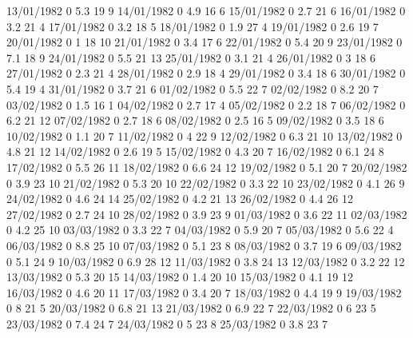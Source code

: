 13/01/1982  0      5.3    19     9 
14/01/1982  0      4.9    16     6 
15/01/1982  0      2.7    21     6 
16/01/1982  0      3.2    21     4 
17/01/1982  0      3.2    18     5 
18/01/1982  0      1.9    27     4 
19/01/1982  0      2.6    19     7 
20/01/1982  0      1      18     10 
21/01/1982  0      3.4    17     6 
22/01/1982  0      5.4    20     9 
23/01/1982  0      7.1    18     9 
24/01/1982  0      5.5    21     13 
25/01/1982  0      3.1    21     4 
26/01/1982  0      3      18     6 
27/01/1982  0      2.3    21     4 
28/01/1982  0      2.9    18     4 
29/01/1982  0      3.4    18     6 
30/01/1982  0      5.4    19     4 
31/01/1982  0      3.7    21     6 
01/02/1982  0      5.5    22     7 
02/02/1982  0      8.2    20     7 
03/02/1982  0      1.5    16     1 
04/02/1982  0      2.7    17     4 
05/02/1982  0      2.2    18     7 
06/02/1982  0      6.2    21     12 
07/02/1982  0      2.7    18     6 
08/02/1982  0      2.5    16     5 
09/02/1982  0      3.5    18     6 
10/02/1982  0      1.1    20     7 
11/02/1982  0      4      22     9 
12/02/1982  0      6.3    21     10 
13/02/1982  0      4.8    21     12 
14/02/1982  0      2.6    19     5 
15/02/1982  0      4.3    20     7 
16/02/1982  0      6.1    24     8 
17/02/1982  0      5.5    26     11 
18/02/1982  0      6.6    24     12 
19/02/1982  0      5.1    20     7 
20/02/1982  0      3.9    23     10 
21/02/1982  0      5.3    20     10 
22/02/1982  0      3.3    22     10 
23/02/1982  0      4.1    26     9 
24/02/1982  0      4.6    24     14 
25/02/1982  0      4.2    21     13 
26/02/1982  0      4.4    26     12 
27/02/1982  0      2.7    24     10 
28/02/1982  0      3.9    23     9 
01/03/1982  0      3.6    22     11 
02/03/1982  0      4.2    25     10 
03/03/1982  0      3.3    22     7 
04/03/1982  0      5.9    20     7 
05/03/1982  0      5.6    22     4 
06/03/1982  0      8.8    25     10 
07/03/1982  0      5.1    23     8 
08/03/1982  0      3.7    19     6 
09/03/1982  0      5.1    24     9 
10/03/1982  0      6.9    28     12 
11/03/1982  0      3.8    24     13 
12/03/1982  0      3.2    22     12 
13/03/1982  0      5.3    20     15 
14/03/1982  0      1.4    20     10 
15/03/1982  0      4.1    19     12 
16/03/1982  0      4.6    20     11 
17/03/1982  0      3.4    20     7 
18/03/1982  0      4.4    19     9 
19/03/1982  0      8      21     5 
20/03/1982  0      6.8    21     13 
21/03/1982  0      6.9    22     7 
22/03/1982  0      6      23     5 
23/03/1982  0      7.4    24     7 
24/03/1982  0      5      23     8 
25/03/1982  0      3.8    23     7 
